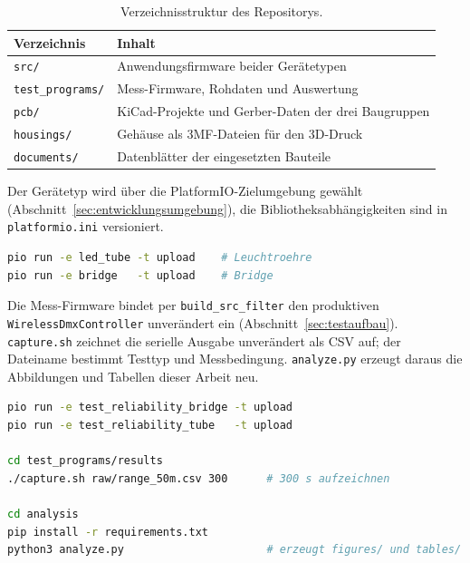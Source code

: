 \begin{table}[H]
    \centering
    \small
    \caption{Verzeichnisstruktur des Repositorys.}
    \label{tab:repo-struktur}
    \begin{tabular}{ll}
        \toprule
        Verzeichnis & Inhalt \\
        \midrule
        \texttt{src/}            & Anwendungsfirmware beider Gerätetypen \\
        \texttt{test\_programs/} & Mess-Firmware, Rohdaten und Auswertung \\
        \texttt{pcb/}            & KiCad-Projekte und Gerber-Daten der drei Baugruppen \\
        \texttt{housings/}       & Gehäuse als 3MF-Dateien für den 3D-Druck \\
        \texttt{documents/}      & Datenblätter der eingesetzten Bauteile \\
        \bottomrule
    \end{tabular}
\end{table}

Der Gerätetyp wird über die PlatformIO-Zielumgebung gewählt
(Abschnitt~\ref{sec:entwicklungsumgebung}), die Bibliotheksabhängigkeiten sind
in \texttt{platformio.ini} versioniert.

\begin{lstlisting}[language=bash, caption={Übersetzen und Flashen.}, captionpos=b]
pio run -e led_tube -t upload    # Leuchtroehre
pio run -e bridge   -t upload    # Bridge
\end{lstlisting}

Die Mess-Firmware bindet per \texttt{build\_src\_filter} den produktiven
\texttt{WirelessDmxController} unverändert ein
(Abschnitt~\ref{sec:testaufbau}). \texttt{capture.sh} zeichnet die serielle
Ausgabe unverändert als CSV auf; der Dateiname bestimmt Testtyp und
Messbedingung. \texttt{analyze.py} erzeugt daraus die Abbildungen und Tabellen
dieser Arbeit neu.

\begin{lstlisting}[language=bash, caption={Messreihe aufzeichnen und auswerten.}, captionpos=b]
pio run -e test_reliability_bridge -t upload
pio run -e test_reliability_tube   -t upload

cd test_programs/results
./capture.sh raw/range_50m.csv 300      # 300 s aufzeichnen

cd analysis
pip install -r requirements.txt
python3 analyze.py                      # erzeugt figures/ und tables/
\end{lstlisting}
